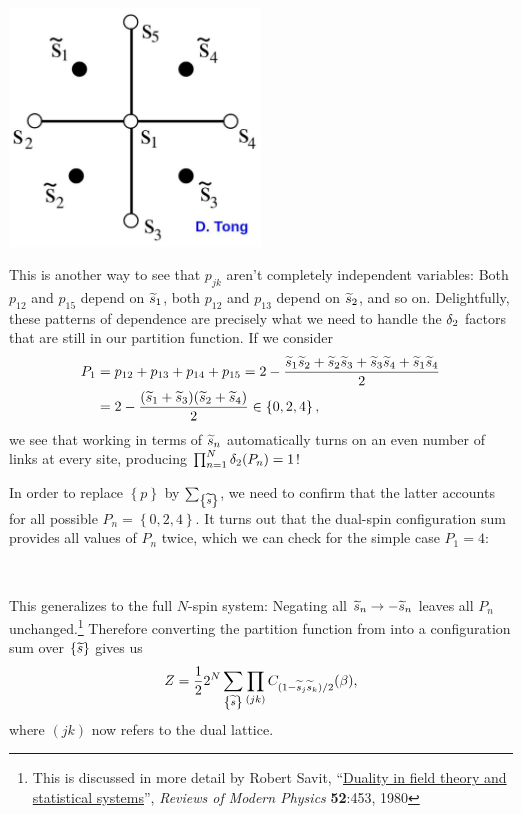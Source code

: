 \begin{center}\includegraphics[width=0.5\textwidth]{figs/unit09_dual_lattice.pdf}\end{center}

This is another way to see that $p_{jk}$ aren't completely independent variables: Both $p_{12}$ and $p_{15}$ depend on $\widetilde s_1$, both $p_{12}$ and $p_{13}$ depend on $\widetilde s_2$, and so on.
Delightfully, these patterns of dependence are precisely what we need to handle the $\delta_2$ factors that are still in our partition function.
If we consider
\begin{align*}
  P_1 & = p_{12} + p_{13} + p_{14} + p_{15} = 2 - \frac{\widetilde s_1 \widetilde s_2 + \widetilde s_2 \widetilde s_3 + \widetilde s_3 \widetilde s_4 + \widetilde s_1 \widetilde s_4}{2} \\
      & = 2 - \frac{(\widetilde s_1 + \widetilde s_3)(\widetilde s_2 + \widetilde s_4)}{2} \in \left\{0, 2, 4\right\},
\end{align*}
we see that working in terms of $\widetilde s_n$ automatically turns on an even number of links at every site, producing $\prod_{n = 1}^N \delta_2(P_n) = 1$!

In order to replace $\left\{p\right\}$ by $\sum_{\left\{\widetilde s\right\}}$, we need to confirm that the latter accounts for all possible $P_n = \left\{0, 2, 4\right\}$.
It turns out that the dual-spin configuration sum provides all values of $P_n$ twice, which we can check for the simple case $P_1 = 4$: %
\begin{mdframed}
  \ \\[50 pt]
\end{mdframed}
This generalizes to the full $N$-spin system: Negating all $\widetilde s_n \to -\widetilde s_n$ leaves all $P_n$ unchanged.\footnote{This is discussed in more detail by Robert Savit, ``\href{https://doi.org/10.1103/RevModPhys.52.453}{Duality in field theory and statistical systems}'', \textit{Reviews of Modern Physics} \textbf{52}:453, 1980}
Therefore converting the partition function from  into a configuration sum over $\left\{\widetilde s\right\}$ gives us
\begin{equation*}
  Z = \frac{1}{2} 2^N \sum_{\left\{\widetilde s\right\}} \prod_{(jk)} C_{(1 - \widetilde s_j \widetilde s_k) / 2}(\beta),
\end{equation*}
where $(jk)$ now refers to the dual lattice.

